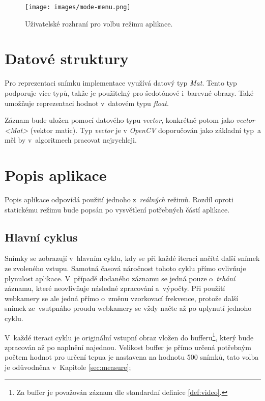 \documentclass[
  digital, %
  table,   %
%
  lof,     %
  lot,     %
]{fithesis3}
\begin{document}
\begin{figure}
  \begin{center}
    \texttt{[image: images/mode-menu.png]}
  \end{center}
  \caption{Uživatelské rozhraní pro volbu režimu aplikace.}
  \label{fig:mode-menu}
\end{figure}

\section{Datové struktury}
Pro reprezentaci snímku implementace využívá datový typ \emph{Mat}. Tento typ podporuje více typů, takže je použitelný pro šedotónové i~barevné obrazy. Také umožňuje reprezentaci hodnot v~datovém typu \emph{float}.

Záznam bude uložen pomocí datového typu \emph{vector}, konkrétně potom jako \emph{vector <Mat>} (vektor matic). Typ \emph{vector} je v \emph{OpenCV} doporučován jako základní typ~a měl by v~algoritmech pracovat nejrychleji.

\section{Popis aplikace}
Popis aplikace odpovídá použití jednoho z~\emph{reálných} režimů. Rozdíl oproti statickému režimu bude popsán po vysvětlení potřebných částí aplikace.

\subsection{Hlavní cyklus}
Snímky se zobrazují v~hlavním cyklu, kdy se při každé iteraci načítá další snímek ze zvoleného vstupu. Samotná časová náročnost tohoto cyklu přímo ovlivňuje plynulost aplikace. V~případě dodaného záznamu se jedná pouze o~\emph{trhání} záznamu, které neovlivňuje následné zpracování a~výpočty. Při použití webkamery se ale jedná přímo o~změnu vzorkovací frekvence, protože další snímek ze~vsutpnáho proudu webkamery se vždy načte až po uplynutí jednoho cyklu.

V~každé iteraci cyklu je originální vstupní obraz vložen do bufferu\footnote{Za buffer je považován záznam dle standardní definice \ref{def:video}.}, který bude zpracován až po naplnění najednou. Velikost buffer je přímo určená potřebným počtem hodnot pro určení tepua je nastavena na hodnotu 500 snímků, tato volba je odůvodněna v~Kapitole \ref{sec:measure};
\end{document}
